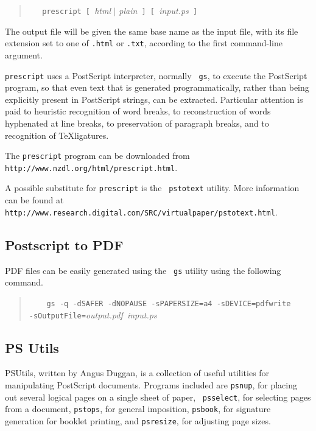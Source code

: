 \documentclass[twoside,11pt]{article}
\newcommand{\htmladdnormallink}[2]{#1}
\newcommand{\htmlref}[2]{#1}
\newcommand{\latex}[1]{#1}
\newcommand{\xlabel}[1]{}
\begin{document}
\begin{quote}
\verb+   prescript [ +{\em html} $\mid$ {\em plain}\verb+ ] [ +{\em input.ps}\verb+ ]+
\end{quote}

The output file will be given the same base name as the input file,
with its file extension set to one of {\tt .html} or {\tt .txt},
according to the first command-line argument.

{\tt prescript} uses a PostScript interpreter, normally \htmlref{{\tt
gs}}{sc15_gs}, to execute the PostScript program, so that even text
that is generated programmatically, rather than being explicitly
present in PostScript strings, can be extracted. Particular attention
is paid to heuristic recognition of word breaks, to reconstruction of
words hyphenated at line breaks, to preservation of paragraph breaks,
and to recognition of \TeX ligatures.

The {\tt prescript} program can be downloaded from
\htmladdnormallink{{\tt
http://www.nzdl.org/html/prescript.html}}{http://www.nzdl.org/html/prescript.html}.

A possible substitute for {\tt prescript} is the
\htmladdnormallink{{\tt
pstotext}}{http://www.research.digital.com/SRC/virtualpaper/pstotext.html}
utility. \latex{ More information can be found at {\tt
http://www.research.digital.com/SRC/virtualpaper/pstotext.html}.}

\subsection{\xlabel{sc15_pstopdf}Postscript to PDF\label{sc15_pstopdf}}

PDF files can be easily generated using the \htmlref{{\tt
gs}}{sc15_gs} utility using the following command.

\begin{quote}
\verb+    gs -q -dSAFER -dNOPAUSE -sPAPERSIZE=a4 -sDEVICE=pdfwrite+\linebreak
\verb+       -sOutputFile=+{\em output.pdf}\verb+ +{\em input.ps}
\end{quote}

\subsection{\xlabel{sc15_pstools}PS Utils\label{sc15_pstools}}

\htmladdnormallink{PSUtils}{http://www.dcs.ed.ac.uk/home/ajcd/psutils/index.html},
written by Angus Duggan, is a collection of useful utilities for
manipulating PostScript documents. Programs included are {\tt psnup},
for placing out several logical pages on a single sheet of paper, {\tt
psselect}, for selecting pages from a document, {\tt pstops}, for
general imposition, {\tt psbook}, for signature generation for booklet
printing, and {\tt psresize}, for adjusting page sizes.
\end{document}
